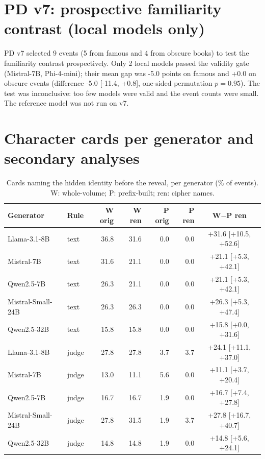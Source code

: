 \documentclass[11pt]{article}
\begin{document}
\section{PD v7: prospective familiarity contrast (local models only)}
PD v7 selected 9 events (5 from famous and 4 from obscure books) to test the familiarity contrast prospectively. Only 2 local models passed the validity gate (Mistral-7B, Phi-4-mini); their mean gap was -5.0 points on famous and +0.0 on obscure events (difference -5.0 [-11.4, +0.8], one-sided permutation $p=0.95$). The test was inconclusive: too few models were valid and the event counts were small. The reference model was not run on v7.

\section{Character cards per generator and secondary analyses}
\begin{table}[!ht]
\centering
\scriptsize
\caption{Cards naming the hidden identity before the reveal, per generator (\% of events). W: whole-volume; P: prefix-built; ren: cipher names.}\label{tab:s-cards}
\begin{tabular}{llrrrrc}
\toprule
Generator & Rule & W orig & W ren & P orig & P ren & W$-$P ren \\
\midrule
Llama-3.1-8B & text & 36.8 & 31.6 & 0.0 & 0.0 & +31.6 [+10.5, +52.6] \\
Mistral-7B & text & 31.6 & 21.1 & 0.0 & 0.0 & +21.1 [+5.3, +42.1] \\
Qwen2.5-7B & text & 26.3 & 21.1 & 0.0 & 0.0 & +21.1 [+5.3, +42.1] \\
Mistral-Small-24B & text & 26.3 & 26.3 & 0.0 & 0.0 & +26.3 [+5.3, +47.4] \\
Qwen2.5-32B & text & 15.8 & 15.8 & 0.0 & 0.0 & +15.8 [+0.0, +31.6] \\
Llama-3.1-8B & judge & 27.8 & 27.8 & 3.7 & 3.7 & +24.1 [+11.1, +37.0] \\
Mistral-7B & judge & 13.0 & 11.1 & 5.6 & 0.0 & +11.1 [+3.7, +20.4] \\
Qwen2.5-7B & judge & 16.7 & 16.7 & 1.9 & 0.0 & +16.7 [+7.4, +27.8] \\
Mistral-Small-24B & judge & 27.8 & 31.5 & 1.9 & 3.7 & +27.8 [+16.7, +40.7] \\
Qwen2.5-32B & judge & 14.8 & 14.8 & 1.9 & 0.0 & +14.8 [+5.6, +24.1] \\
\bottomrule
\end{tabular}
\end{table}
\end{document}
